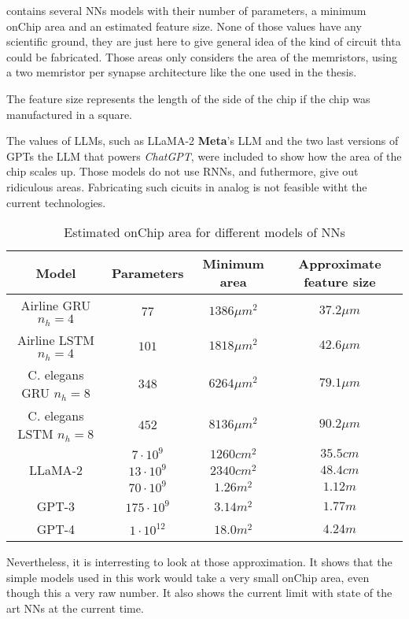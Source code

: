  contains several \acp{NN} models with their number of parameters, a minimum onChip area and an estimated feature size. None of those values have any scientific ground, they are just here to give general idea of the kind of circuit thta could be fabricated. Those areas only considers the area of the memristors, using a two memristor per synapse architecture like the one used in the thesis.

The feature size represents the length of the side of the chip if the chip was manufactured in a square.

The values of \acp{LLM}, such as \ac{LLaMA}-2 \textbf{Meta}'s \ac{LLM} and the two last versions of \acp{GPT} the \ac{LLM} that powers \textit{ChatGPT}, were included to show how the area of the chip scales up. Those models do not use \acp{RNN}, and futhermore, give out ridiculous areas. Fabricating such cicuits in analog is not feasible witht the current technologies.

\begin{table}[H]
  \centering
  \begin{tabular}{|c|c|c|c|}
    \hline
    \rowcolor{gray}
    Model & Parameters & Minimum area & Approximate feature size \\
    \hline
    Airline \ac{GRU} $n_h=4$ & $77$ & $1386\mu m^2$ & $37.2\mu m$\\
    \hline
    Airline \ac{LSTM} $n_h=4$ & $101$ & $1818\mu m^2$ & $42.6\mu m$\\
    \hline
    \ac{C. elegans} \ac{GRU} $n_h=8$ & $348$ & $6264\mu m^2$ & $79.1\mu m$\\
    \hline
    \ac{C. elegans} \ac{LSTM} $n_h=8$ & $452$ & $8136\mu m^2$ & $90.2\mu m$\\
    \hline
    \multirow{3}{*}{\acs{LLaMA}-2} & $7\cdot 10^9$ & $1260 cm^2$ & $35.5 cm$ \\
    \cline{2-4}
    & $13\cdot 10^9$ & $2340 cm^2$ & $48.4 cm$ \\
    \cline{2-4}
    & $70\cdot 10^9$ & $1.26 m^2$ & $1.12 m$ \\
    \hline
    \acs{GPT}-3 & $175\cdot 10^9$ & $3.14 m^2$ & $1.77m$\\
    \hline
    \acs{GPT}-4 & $1\cdot 10^{12}$ & $18.0 m^2$ & $4.24m$\\
    \hline
  \end{tabular}
  \caption{Estimated onChip area for different models of \acp{NN}}
  \label{tab:areas}
\end{table}

Nevertheless, it is interresting to look at those approximation. It shows that the simple models used in this work would take a very small onChip area, even though this a very raw number. It also shows the current limit with state of the art \acp{NN} at the current time.
